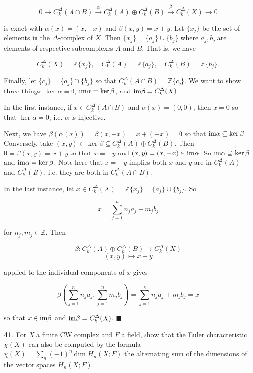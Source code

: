 \documentclass{article}
\newcommand{\Z}{\mathbb{Z}}
\newcommand{\im}{\textnormal{im}}
\begin{document}
$$0\to C_{k}^{\Delta}(A\cap B)\xrightarrow{\alpha} C_{k}^{\Delta}(A)\oplus C_{k}^{\Delta}(B)\xrightarrow{\beta} C_{k}^{\Delta}(X)\to 0$$

is exact with $\alpha(x) = (x, -x)$ and $\beta(x, y) = x + y$. Let $\{x_{j}\}$ be the set of elements in the $\Delta$-complex of $X$. Then $\{x_{j}\} = \{a_{j}\}\cup \{b_{j}\}$
where $a_{j}, b_{j}$ are elements of respective subcomplexes $A$ and $B$. That is, we have

$$C_{k}^{\Delta}(X) = \Z \{x_{j}\},\quad C_{k}^{\Delta}(A) = \Z \{a_{j}\},\quad C_{k}^{\Delta}(B) = \Z \{b_{j}\}.$$

Finally, let $\{c_{j}\} = \{a_{j}\}\cap \{b_{j}\}$ so that $C_{k}^{\Delta}(A\cap B) = \Z \{c_{j}\}$. We want to show three things: $\ker \alpha = 0$, $\im \alpha = \ker \beta$, and $\im \beta = C_{k}^{\Delta}(X)$.
\medskip

In the first instance, if $x\in C_{k}^{\Delta}(A\cap B)$ and $\alpha(x) = (0, 0)$, then $x = 0$ so that $\ker \alpha = 0$, i.e. $\alpha$ is injective.
\medskip

Next, we have $\beta(\alpha(x)) = \beta(x, -x) = x + (-x) = 0$ so that $\im \alpha\subseteq \ker \beta$. Conversely, take $(x, y)\in \ker \beta\subseteq C_{k}^{\Delta}(A)\oplus C_{k}^{\Delta}(B)$. Then $0 = \beta(x, y) = x + y$ so that $x = -y$ and $(x, y) = (x, -x)\in \im \alpha$. So $\im \alpha\supseteq \ker \beta$ and $\im \alpha = \ker \beta$. Note here that $x = -y$ implies both $x$ and $y$ are in $C_{k}^{\Delta}(A)$ and $C_{k}^{\Delta}(B)$, i.e. they are both in $C_{k}^{\Delta}(A\cap B)$.
\medskip

In the last instance, let $x\in C_{k}^{\Delta}(X) = \Z\{x_{j}\} = \{a_{j}\}\cup \{b_{j}\}$. So

$$x = \sum_{j=1}^{n}n_{j}a_{j} + m_{j}b_{j}$$

for $n_{j},m_{j}\in \Z$. Then

$$\beta: C_{k}^{\Delta}(A)\oplus C_{k}^{\Delta}(B)\to C_{k}^{\Delta}(X)$$
$$(x, y)\mapsto x + y$$

applied to the individual components of $x$ gives

$$\beta\left(\sum_{j=1}^{n}n_{j}a_{j}, \sum_{j=1}^{n}m_{j}b_{j}\right) = \sum_{j=1}^{n}n_{j}a_{j} + m_{j}b_{j} = x$$

so that $x\in \im \beta$ and $\im \beta = C_{k}^{\Delta}(X)$. $\blacksquare$
\bigskip
\bigskip

\textbf{41}. For $X$ a finite CW complex and $F$ a field, show that the Euler characteristic $\chi(X)$ can also be computed by the formula $\chi(X) = \sum_{n}(-1)^{n} \dim H_{n}(X;F)$ the alternating sum of the dimensions of the vector spaces $H_{n}(X;F)$.
\medskip
\end{document}

